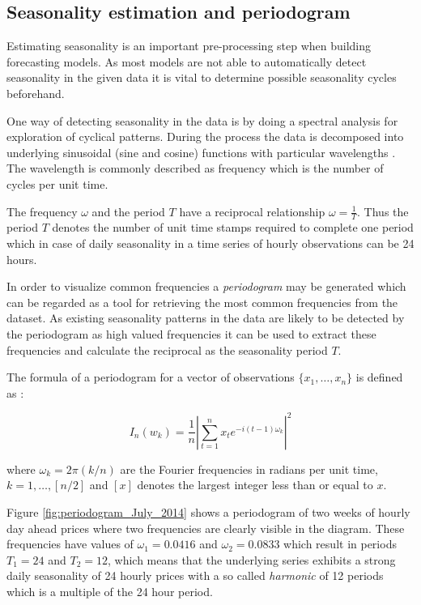 \subsection{Seasonality estimation and periodogram}

Estimating seasonality is an important pre-processing step when building forecasting models. As most models are not able to automatically detect seasonality in the given data it is vital to determine possible seasonality cycles beforehand. 

One way of detecting seasonality in the data is by doing a spectral analysis for exploration of cyclical patterns. 
During the process the data is decomposed into underlying sinusoidal (sine and cosine) functions with particular wavelengths \cite{weron2007modeling}. 
The wavelength is commonly described as frequency which is the number of cycles per unit time. 

The frequency $\omega$ and the period $T$ have a reciprocal relationship $\omega = \frac{1}{T}$. Thus the period $T$ denotes the number of unit time stamps required to complete one period which in case of daily seasonality in a time series of hourly observations can be 24 hours. 

In order to visualize common frequencies a \textit{periodogram} may be generated which can be regarded as a tool for retrieving the most common frequencies from the dataset. As existing seasonality patterns in the data are likely to be detected by the periodogram as high valued frequencies it can be used to extract these frequencies and calculate the reciprocal as the seasonality period $T$. 

The formula of a periodogram for a vector of observations $\{x_1,\ldots,x_n\}$ is defined as \cite{weron2007modeling}:

		\[ I_n (w_k) = \frac{1}{n} \left| \sum_{t=1}^{n}{x_t  e^{-i(t-1) \omega_k} } \right|^2 \]
		
		where $\omega_k = 2 \pi (k/n)$ are the Fourier frequencies in radians per unit time, $k = 1,\ldots,[n/2]$ and $[x]$ denotes the largest integer less than or equal to $x$. 

Figure \ref{fig:periodogram_July_2014} shows a periodogram of two weeks of hourly day ahead prices where two frequencies are clearly visible in the diagram. These frequencies have values of $\omega_1 = 0.0416$ and $\omega_2 = 0.0833$ which result in periods $T_1 = 24$ and $T_2 = 12$, which means that the underlying series exhibits a strong daily seasonality of 24 hourly prices with a so called \textit{harmonic} of 12 periods which is a multiple of the 24 hour period. 

